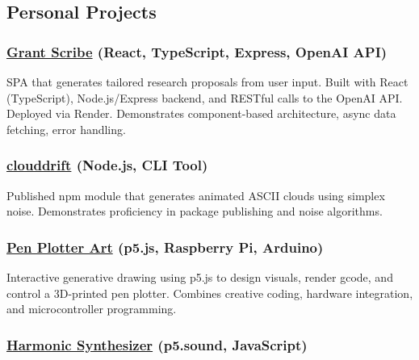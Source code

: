 \documentclass[11pt,a4paper]{article}
\begin{document}
\subsection{Personal Projects}\label{personal-projects}

\subsubsection{\texorpdfstring{\href{https://granter.onrender.com/}{Grant
Scribe} (React, TypeScript, Express, OpenAI
API)}{Grant Scribe (React, TypeScript, Express, OpenAI API)}}\label{grant-scribe-react-typescript-express-openai-api}

SPA that generates tailored research proposals from user input. Built
with React (TypeScript), Node.js/Express backend, and RESTful calls to
the OpenAI API. Deployed via Render. Demonstrates component-based
architecture, async data fetching, error handling.

\subsubsection{\texorpdfstring{\href{https://github.com/thrly/clouddrift}{clouddrift}
(Node.js, CLI
Tool)}{clouddrift (Node.js, CLI Tool)}}\label{clouddrift-node.js-cli-tool}

Published npm module that generates animated ASCII clouds using simplex
noise. Demonstrates proficiency in package publishing and noise
algorithms.

\subsubsection{\texorpdfstring{\href{https://github.com/thrly/pen-plotter-resources}{Pen
Plotter Art} (p5.js, Raspberry Pi,
Arduino)}{Pen Plotter Art (p5.js, Raspberry Pi, Arduino)}}\label{pen-plotter-art-p5.js-raspberry-pi-arduino}

Interactive generative drawing using p5.js to design visuals, render
gcode, and control a 3D-printed pen plotter. Combines creative coding,
hardware integration, and microcontroller programming.

\subsubsection{\texorpdfstring{\href{https://github.com/thrly/harmonic-series-synth}{Harmonic
Synthesizer} (p5.sound,
JavaScript)}{Harmonic Synthesizer (p5.sound, JavaScript)}}\label{harmonic-synthesizer-p5.sound-javascript}
\end{document}
